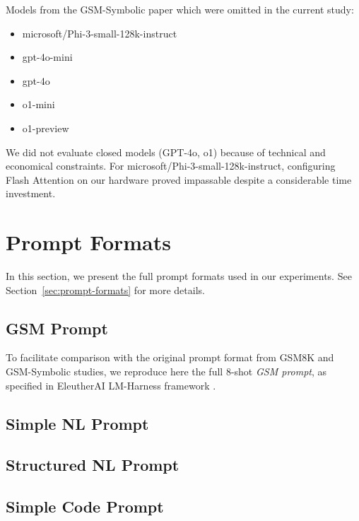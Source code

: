 \documentclass[11pt]{article}
\begin{document}
Models from the GSM-Symbolic paper which were omitted in the current study:
\begin{itemize}
    \setlength{\itemsep}{-0.5em}
    \item microsoft/Phi-3-small-128k-instruct
    \item gpt-4o-mini
    \item gpt-4o
    \item o1-mini
    \item o1-preview
\end{itemize}

We did not evaluate closed models (GPT-4o, o1) because of technical and economical constraints. For microsoft/Phi-3-small-128k-instruct, configuring Flash Attention on our hardware proved impassable despite a considerable time investment.

\onecolumn

\newpage
\section{Prompt Formats}
In this section, we present the full prompt formats used in our experiments. See Section~\ref{sec:prompt-formats} for more details.

\label{apx:full-prompts}

\subsection*{GSM Prompt}
To facilitate comparison with the original prompt format from GSM8K and GSM-Symbolic studies, we reproduce here the full 8-shot \textit{GSM prompt}, as specified in EleutherAI LM-Harness framework \citep{eval-harness}. 

\subsection*{Simple NL Prompt}


\subsection*{Structured NL Prompt}


\subsection*{Simple Code Prompt}

\end{document}
